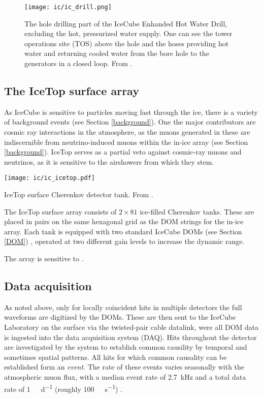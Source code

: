 \begin{figure}[]
    \texttt{[image: ic/ic\_drill.png]}
    \caption[IceCube enhanced hot water drill]{The hole drilling part of the IceCube Enhanded Hot Water Drill, excluding the hot, pressurized water supply. One can see the tower operations site (TOS) above the hole and the hoses providing hot water and returning cooled water from the bore hole to the generators in a closed loop. From \cite{Benson2014}.}
\end{figure}

\subsection{The IceTop surface array}
As IceCube is sensitive to particles moving fast through the ice, there is a variety of background events (see Section \ref{background}). One the major contributors are cosmic ray interactions in the atmosphere, as the muons generated in these are indiscernible from neutrino-induced muons within the in-ice array (see Section \ref{background}). IceTop serves as a partial veto against cosmic-ray muons and neutrinos, as it is sensitive to the airshowers from which they stem.

\begin{marginfigure}
    \texttt{[image: ic/ic\_icetop.pdf]}
    \caption[IceTop detector]{IceTop surface Cherenkov detector tank. From \cite{Abbasi2013}.}
\end{marginfigure}

The IceTop surface array consists of $2\times81$ ice-filled Cherenkov tanks. These are placed in pairs on the same hexagonal grid as the DOM strings for the in-ice array. Each tank is equipped with two standard IceCube DOMs (see Section \ref{DOM}) \cite{Abbasi2013}, operated at two different gain levels to increase the dynamic range.

The array is sensitive to .

\subsection{Data acquisition}\label{data_acquisition}
As noted above, only for locally coincident hits in multiple detectors the full waveforms are digitized by the DOMs. These are then sent to the IceCube Laboratory on the surface via the twisted-pair cable datalink, were all DOM data is ingested into the data acquisition system (DAQ). Hits throughout the detector are investigated by the system to establish common causility by temporal and sometimes spatial patterns. All hits for which common causality can be established form an \textit{event}. The rate of these events varies seasonally with the atmospheric muon flux, with a median event rate of \SI{2.7}{\kilo\Hz} and a total data rate of \SI{1}{\tera\byte\per\day} (roughly \SI{100}{\mega\bit\per\second}) \cite{Aartsen2017}.

